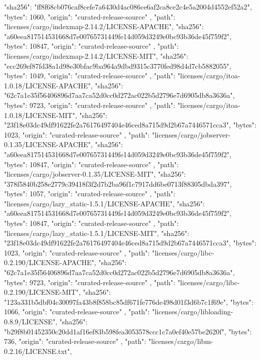 {{      "sha256": "ff8f68cb076caf8cefe7a6430d4ac086ce6af2ca8ce2c4e5a2004d4552ef52a2",
      "bytes": 1060,
      "origin": "curated-release-source"
    },
    {
      "path": "licenses/cargo/indexmap-2.14.2/LICENSE-APACHE",
      "sha256": "a60eea817514531668d7e00765731449fe14d059d3249e0bc93b36de45f759f2",
      "bytes": 10847,
      "origin": "curated-release-source"
    },
    {
      "path": "licenses/cargo/indexmap-2.14.2/LICENSE-MIT",
      "sha256": "ecc269ef87fd38a1d98e30bfac9ba964a9dbd9315c3770fed98d4d7cb5882055",
      "bytes": 1049,
      "origin": "curated-release-source"
    },
    {
      "path": "licenses/cargo/itoa-1.0.18/LICENSE-APACHE",
      "sha256": "62c7a1e35f56406896d7aa7ca52d0cc0d272ac022b5d2796e7d6905db8a3636a",
      "bytes": 9723,
      "origin": "curated-release-source"
    },
    {
      "path": "licenses/cargo/itoa-1.0.18/LICENSE-MIT",
      "sha256": "23f18e03dc49df91622fe2a76176497404e46ced8a715d9d2b67a7446571cca3",
      "bytes": 1023,
      "origin": "curated-release-source"
    },
    {
      "path": "licenses/cargo/jobserver-0.1.35/LICENSE-APACHE",
      "sha256": "a60eea817514531668d7e00765731449fe14d059d3249e0bc93b36de45f759f2",
      "bytes": 10847,
      "origin": "curated-release-source"
    },
    {
      "path": "licenses/cargo/jobserver-0.1.35/LICENSE-MIT",
      "sha256": "378f5840b258e2779c39418f3f2d7b2ba96f1c7917dd6be0713f88305dbda397",
      "bytes": 1057,
      "origin": "curated-release-source"
    },
    {
      "path": "licenses/cargo/lazy_static-1.5.1/LICENSE-APACHE",
      "sha256": "a60eea817514531668d7e00765731449fe14d059d3249e0bc93b36de45f759f2",
      "bytes": 10847,
      "origin": "curated-release-source"
    },
    {
      "path": "licenses/cargo/lazy_static-1.5.1/LICENSE-MIT",
      "sha256": "23f18e03dc49df91622fe2a76176497404e46ced8a715d9d2b67a7446571cca3",
      "bytes": 1023,
      "origin": "curated-release-source"
    },
    {
      "path": "licenses/cargo/libc-0.2.190/LICENSE-APACHE",
      "sha256": "62c7a1e35f56406896d7aa7ca52d0cc0d272ac022b5d2796e7d6905db8a3636a",
      "bytes": 9723,
      "origin": "curated-release-source"
    },
    {
      "path": "licenses/cargo/libc-0.2.190/LICENSE-MIT",
      "sha256": "123a331b5dbf04c30097fa43b8f858bc85df671fe776de498d01f3d6b7c1f69e",
      "bytes": 1066,
      "origin": "curated-release-source"
    },
    {
      "path": "licenses/cargo/libloading-0.8.9/LICENSE",
      "sha256": "b29f8b01452350c20dd1af16ef83b598fea3053578ccc1c7a0ef40e57be2620f",
      "bytes": 736,
      "origin": "curated-release-source"
    },
    {
      "path": "licenses/cargo/libm-0.2.16/LICENSE.txt",
}}
